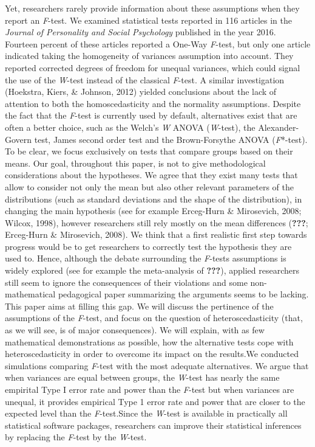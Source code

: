 \documentclass[man,floatsintext]{apa6}
\begin{document}
Yet, researchers rarely provide information about these assumptions when
they report an \emph{F}-test. We examined statistical tests reported in
116 articles in the \emph{Journal of Personality and Social Psychology}
published in the year 2016. Fourteen percent of these articles reported
a One-Way \emph{F}-test, but only one article indicated taking the
homogeneity of variances assumption into account. They reported
corrected degrees of freedom for unequal variances, which could signal
the use of the \emph{W}-test instead of the classical \emph{F}-test. A
similar investigation (Hoekstra, Kiers, \& Johnson, 2012) yielded
conclusions about the lack of attention to both the homoscedasticity and
the normality assumptions. Despite the fact that the \emph{F}-test is
currently used by default, alternatives exist that are often a better
choice, such as the Welch's \emph{W} ANOVA (\emph{W}-test), the
Alexander-Govern test, James second order test and the Brown-Forsythe
ANOVA (\emph{F}*-test). To be clear, we focus exclusively on tests that
compare groups based on their means. Our goal, throughout this paper, is
not to give methodological considerations about the hypotheses. We agree
that they exist many tests that allow to consider not only the mean but
also other relevant parameters of the distributions (such as standard
deviations and the shape of the distribution), in changing the main
hypothesis (see for example Erceg-Hurn \& Mirosevich, 2008; Wilcox,
1998), however researchers still rely mostly on the mean differences
({\textbf{???}}; Erceg-Hurn \& Mirosevich, 2008). We think that a first
realistic first step towards progress would be to get researchers to
correctly test the hypothesis they are used to. Hence, although the
debate surrounding the \emph{F}-tests assumptions is widely explored
(see for example the meta-analysis of {\textbf{???}}), applied
researchers still seem to ignore the consequences of their violations
and some non-mathematical pedagogical paper summarizing the arguments
seems to be lacking. This paper aims at filling this gap. We will
discuss the pertinence of the assumptions of the \emph{F}-test, and
focus on the question of heteroscedasticity (that, as we will see, is of
major consequences). We will explain, with as few mathematical
demonstrations as possible, how the alternative tests cope with
heteroscedasticity in order to overcome its impact on the results.We
conducted simulations comparing \emph{F}-test with the most adequate
alternatives. We argue that when variances are equal between groups, the
\emph{W}-test has nearly the same empirital Type I error rate and power
than the \emph{F}-test but when variances are unequal, it provides
empirical Type 1 error rate and power that are closer to the expected
level than the \emph{F}-test.Since the \emph{W}-test is available in
practically all statistical software packages, researchers can improve
their statistical inferences by replacing the \emph{F}-test by the
\emph{W}-test.
\end{document}
